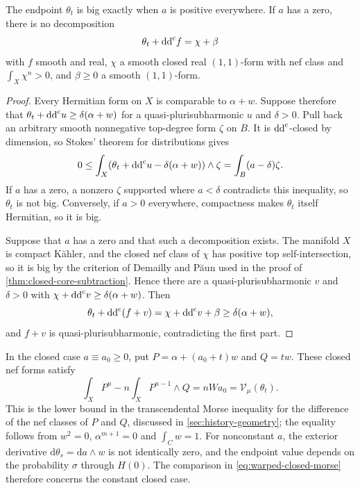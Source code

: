 \begin{proposition}\label{prop:warped-endpoint-closed-core}
The endpoint $\theta_t$ is big exactly when $a$ is positive everywhere. If $a$ has a zero, there is no decomposition
\[
 \theta_t+\mathrm{dd}^{\mathrm{c}} f=\chi+\beta
\]
with $f$ smooth and real, $\chi$ a smooth closed real $(1,1)$-form with nef class and $\int_X\chi^n>0$, and $\beta\geq0$ a smooth $(1,1)$-form.
\end{proposition}
\begin{proof}
Every Hermitian form on $X$ is comparable to $\alpha+w$. Suppose therefore that $\theta_t+\mathrm{dd}^{\mathrm{c}} u\geq\delta(\alpha+w)$ for a quasi-plurisubharmonic $u$ and $\delta>0$. Pull back an arbitrary smooth nonnegative top-degree form $\zeta$ on $B$. It is $\mathrm{dd}^{\mathrm{c}}$-closed by dimension, so Stokes' theorem for distributions gives
\[
 0\leq\int_X(\theta_t+\mathrm{dd}^{\mathrm{c}} u-\delta(\alpha+w))\wedge\zeta
       =\int_B(a-\delta)\zeta.
\]
If $a$ has a zero, a nonzero $\zeta$ supported where $a<\delta$ contradicts this inequality, so $\theta_t$ is not big. Conversely, if $a>0$ everywhere, compactness makes $\theta_t$ itself Hermitian, so it is big.

Suppose that $a$ has a zero and that such a decomposition exists. The manifold $X$ is compact K\"ahler, and the closed nef class of $\chi$ has positive top self-intersection, so it is big by the criterion of Demailly and P{\u a}un used in the proof of \cref{thm:closed-core-subtraction}. Hence there are a quasi-plurisubharmonic $v$ and $\delta>0$ with $\chi+\mathrm{dd}^{\mathrm{c}} v\geq\delta(\alpha+w)$. Then
\[
 \theta_t+\mathrm{dd}^{\mathrm{c}}(f+v)=\chi+\mathrm{dd}^{\mathrm{c}} v+\beta
                         \geq\delta(\alpha+w),
\]
and $f+v$ is quasi-plurisubharmonic, contradicting the first part.
\end{proof}

In the closed case $a\equiv a_0\geq0$, put $P=\alpha+(a_0+t)w$ and $Q=tw$. These closed nef forms satisfy
\begin{equation}\label{eq:warped-closed-morse}
 \int_XP^n-n\int_XP^{n-1}\wedge Q
 =nWa_0=\mathcal V_\mu(\theta_t).
\end{equation}
This is the lower bound in the transcendental Morse inequality for the difference of the nef classes of $P$ and $Q$, discussed in \cref{sec:history-geometry}; the equality follows from $w^2=0$, $\alpha^{m+1}=0$ and $\int_Cw=1$. For nonconstant $a$, the exterior derivative $\mathrm{d}\theta_s=\mathrm{d}a\wedge w$ is not identically zero, and the endpoint value depends on the probability $\sigma$ through $H(0)$. The comparison in \eqref{eq:warped-closed-morse} therefore concerns the constant closed case.

